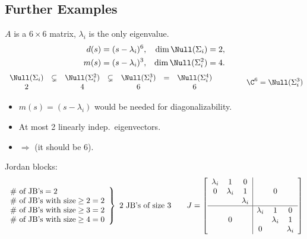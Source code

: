 \subsection{Further Examples}\label{ss:jordan-more}
\begin{example}
\leavevmode{}$A$ is a $6\times6$ matrix, $\lambda_i$ is the only eigenvalue.
\begin{align*}
d(s)&=(s-\lambda_i)^6, & \dim\Null(\Sigma_i)&=2,\\
m(s)&=(s-\lambda_i)^3, & \dim\Null(\Sigma_i^2)&=4.
\end{align*}
\[
\begin{array}{ccccccc}
\Null(\Sigma_i)&\subsetneq&\Null(\Sigma_i^2)&\subsetneq&\Null(\Sigma_i^3)&=&\Null(\Sigma_i^4)\\
2&&4&&6&&6
\end{array}
\qquad\qquad
\C^6=\Null(\Sigma_i^3)
\]
\begin{itemize}[nosep]
\item $m(s)=(s-\lambda_i)$ would be needed for diagonalizability.
\item At most 2 linearly indep.\ eigenvectors.
\item $\Rightarrow$  (it should be 6).
\end{itemize}
Jordan blocks:
\[
\left.\begin{array}{l}
\#\text{ of JB's}=2\\
\#\text{ of JB's with size}\geq2=2\\
\#\text{ of JB's with size}\geq3=2\\
\#\text{ of JB's with size}\geq4=0
\end{array}\right\}\ \text{2 JB's of size 3}
\qquad
J=\left[\begin{array}{ccc|ccc}
\lambda_i&1&0&&&\\
0&\lambda_i&1&&0&\\
&&\lambda_i&&&\\\hline
&&&\lambda_i&1&0\\
&0&&&\lambda_i&1\\
&&&0&&\lambda_i
\end{array}\right]
\]


\end{example}
